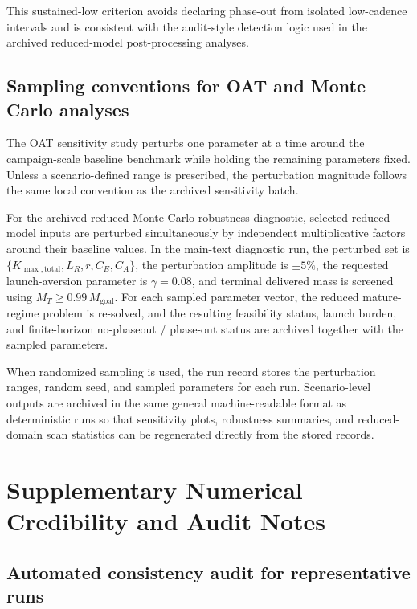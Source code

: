 \documentclass[12pt]{article}
\begin{document}
This sustained-low criterion avoids declaring phase-out from isolated low-cadence intervals and is consistent with the audit-style detection logic used in the archived reduced-model post-processing analyses.

\subsection{Sampling conventions for OAT and Monte Carlo analyses}
\label{app:uq_sampling}

The OAT sensitivity study perturbs one parameter at a time around the campaign-scale baseline benchmark while holding the remaining parameters fixed. Unless a scenario-defined range is prescribed, the perturbation magnitude follows the same local convention as the archived sensitivity batch.

For the archived reduced Monte Carlo robustness diagnostic, selected reduced-model inputs are perturbed simultaneously by independent multiplicative factors around their baseline values. In the main-text diagnostic run, the perturbed set is \(\{K_{\max,\mathrm{total}},L_R,r,C_E,C_A\}\), the perturbation amplitude is \(\pm 5\%\), the requested launch-aversion parameter is \(\gamma=0.08\), and terminal delivered mass is screened using \(M_T\ge 0.99\,M_{\mathrm{goal}}\). For each sampled parameter vector, the reduced mature-regime problem is re-solved, and the resulting feasibility status, launch burden, and finite-horizon no-phaseout / phase-out status are archived together with the sampled parameters.

When randomized sampling is used, the run record stores the perturbation ranges, random seed, and sampled parameters for each run. Scenario-level outputs are archived in the same general machine-readable format as deterministic runs so that sensitivity plots, robustness summaries, and reduced-domain scan statistics can be regenerated directly from the stored records.

\section{Supplementary Numerical Credibility and Audit Notes}
\label{app:credibility}

\subsection{Automated consistency audit for representative runs}
\label{app:consistency_report}
\end{document}
